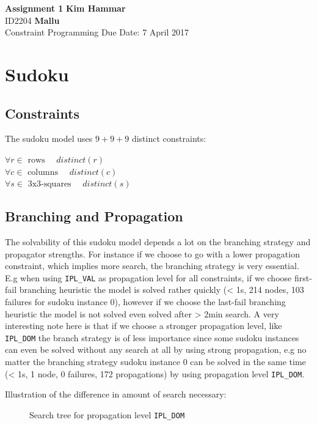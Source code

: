 \documentclass[a4paper, 11pt]{article}
\begin{document}
\noindent
\large\textbf{Assignment 1} \hfill \textbf{Kim Hammar} \\
\normalsize ID2204 \hfill  \textbf{Mallu} \\
Constraint Programming \hfill Due Date: 7 April 2017\\

\section*{Sudoku}
\subsection*{Constraints}
The sudoku model uses $9+9+9$ distinct constraints:

$\forall r \in \text{ rows }\quad distinct(r)$\\
$\forall c \in \text{ columns }\quad distinct(c)$\\
$\forall s \in \text{ 3x3-squares }\quad distinct(s)$

\subsection*{Branching and Propagation}
The solvability of this sudoku model depends a lot on the branching strategy and propagator strengths. For instance if we choose to go with a lower propagation constraint, which implies more search, the branching strategy is very essential. E.g when using \texttt{IPL\_VAL} as propagation level for all constraints, if we choose first-fail branching heuristic the model is solved rather quickly (< 1s, 214 nodes, 103 failures for sudoku instance 0), however if we choose the last-fail branching heuristic the model is not solved even solved after > 2min search. A very interesting note here is that if we choose a stronger propagation level, like \texttt{IPL\_DOM} the branch strategy is of less importance since some sudoku instances can even be solved without any search at all by using strong propagation, e.g no matter the branching strategy sudoku instance $0$ can be solved in the same time (< 1s, 1 node, 0 failures, 172 propagations) by using propagation level \texttt{IPL\_DOM}.

Illustration of the difference in amount of search necessary:

\begin{figure}[H]
  \begin{center}
    \caption{Search tree for propagation level \texttt{IPL\_DOM}}
    \label{fig:dom1}
  \end{center}
\end{figure}
\end{document}
